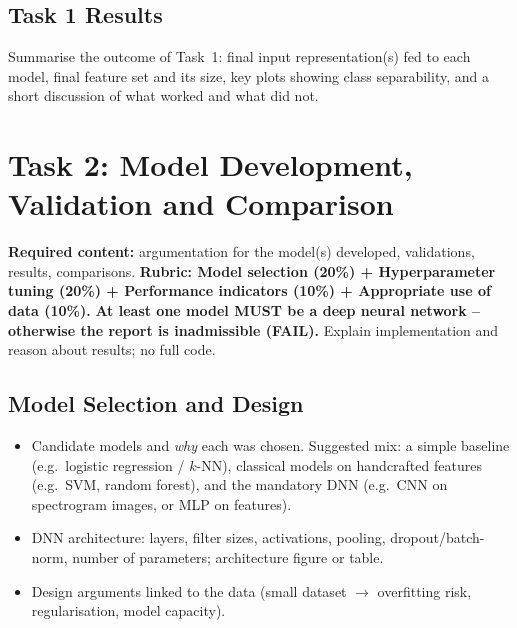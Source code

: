 \documentclass[10pt,a4paper,titlepage]{article}
\newcommand{\placeholder}[1]{\begin{placeholderbox}#1\end{placeholderbox}}
\begin{document}
\subsection{Task 1 Results}
\placeholder{%
Summarise the outcome of Task~1: final input representation(s) fed to each
model, final feature set and its size, key plots showing class separability,
and a short discussion of what worked and what did not.}

\section{Task 2: Model Development, Validation and Comparison}
\label{sec:task2}
\placeholder{%
\textbf{Required content:} argumentation for the model(s) developed,
validations, results, comparisons. \textbf{Rubric: Model selection (20\%) +
Hyperparameter tuning (20\%) + Performance indicators (10\%) + Appropriate use
of data (10\%).} \textbf{At least one model MUST be a deep neural network --
otherwise the report is inadmissible (FAIL).} Explain implementation and reason
about results; no full code.}

\subsection{Model Selection and Design}
\placeholder{%
\begin{itemize}
  \item Candidate models and \emph{why} each was chosen. Suggested mix: a
        simple baseline (e.g.\ logistic regression / $k$-NN), classical
        models on handcrafted features (e.g.\ SVM, random forest), and the
        mandatory DNN (e.g.\ CNN on spectrogram images, or MLP on features).
  \item DNN architecture: layers, filter sizes, activations, pooling,
        dropout/batch-norm, number of parameters; architecture figure or table.
  \item Design arguments linked to the data (small dataset $\rightarrow$
        overfitting risk, regularisation, model capacity).
\end{itemize}}
\end{document}
